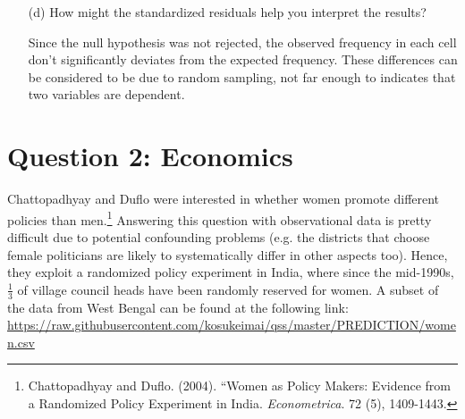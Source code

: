 \documentclass[12pt,letterpaper]{article}
\begin{document}
\begin{enumerate}
\begin{table}[h]
\begin{tabular}{l | c c c }
		\end{tabular}
	\end{table}
	
			  
	
	\vspace{4cm}
	\item [(d)] How might the standardized residuals help you interpret the results?  
	
	\vspace{.25cm}
	
	\noindent Since the null hypothesis was not rejected, the observed frequency in each cell don't significantly deviates from the expected frequency. These differences can be considered to be due to random sampling, not far enough to indicates that two variables are dependent.
	
\end{enumerate}
\newpage

\section*{Question 2: Economics}
Chattopadhyay and Duflo were interested in whether women promote different policies than men.\footnote{Chattopadhyay and Duflo. (2004). ``Women as Policy Makers: Evidence from a Randomized Policy Experiment in India. \textit{Econometrica}. 72 (5), 1409-1443.} Answering this question with observational data is pretty difficult due to potential confounding problems (e.g. the districts that choose female politicians are likely to systematically differ in other aspects too). Hence, they exploit a randomized policy experiment in India, where since the mid-1990s, $\frac{1}{3}$ of village council heads have been randomly reserved for women. A subset of the data from West Bengal can be found at the following link: \url{https://raw.githubusercontent.com/kosukeimai/qss/master/PREDICTION/women.csv}\\
\end{document}
